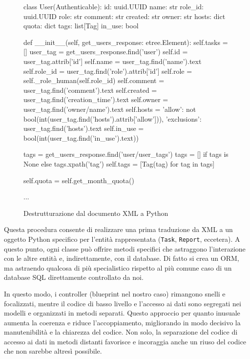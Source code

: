 \begin{figure}
\begin{pycode}
class User(Authenticable):
    id: uuid.UUID
    name: str
    role_id: uuid.UUID
    role: str
    comment: str
    created: str
    owner: str
    hosts: dict
    quota: dict
    tags: list[Tag]
    in_use: bool

    def __init__(self, get_users_response: etree.Element):
        self.tasks = []
        user_tag = get_users_response.find('user')
        self.id = user_tag.attrib['id']
        self.name = user_tag.find('name').text
        self.role_id = user_tag.find('role').attrib['id']
        self.role = self._role_human(self.role_id)
        self.comment = user_tag.find('comment').text
        self.created = user_tag.find('creation_time').text
        self.owner = user_tag.find('owner/name').text
        self.hosts = {
            'allow': not bool(int(user_tag.find('hosts').attrib['allow'])),
            'exclusions': user_tag.find('hosts').text
        }
        self.in_use = bool(int(user_tag.find('in_use').text))

        tags = get_users_response.find('user/user_tags')
        tags = [] if tags is None else tags.xpath('tag')
        self.tags = [Tag(tag) for tag in tags]

        self.quota = self.get_month_quota()
    
    ...
\end{pycode}
\caption{Destrutturazione dal documento XML a Python}
\end{figure}

Questa procedura consente di realizzare una prima traduzione da XML a un oggetto Python specifico per l'entità rappresentata (\texttt{Task}, \texttt{Report}, eccetera). A questo punto, ogni classe può offrire metodi specifici che astraggono l'interazione con le altre entità e, indirettamente, con il database. Di fatto si crea un ORM, ma astraendo qualcosa di più specialistico rispetto al più comune caso di un database SQL direttamente controllato da noi.

In questo modo, i controller (blueprint nel nostro caso) rimangono snelli e focalizzati, mentre il codice di basso livello e l'accesso ai dati sono segregati nei modelli e organizzati in metodi separati. Questo approccio per quanto inusuale aumenta la coerenza e riduce l'accoppiamento, migliorando in modo decisivo la manutenibilità e la chiarezza del codice. Non solo, la separazione del codice di accesso ai dati in metodi distanti favorisce e incoraggia anche un riuso del codice che non sarebbe altresì possibile.

